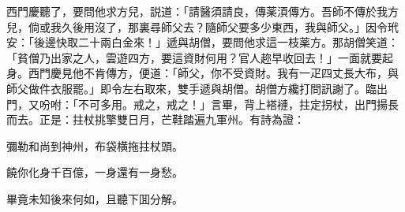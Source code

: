 西門慶聽了，要問他求方兒，説道：「請醫須請良，傳薬湏傳方。吾師不傳於我方兒，倘或我久後用沒了，那裏尋師父去？隨師父要多少東西，我與師父。」因令玳安：「後邊快取二十兩白金來！」遞與胡僧，要問他求這一枝薬方。那胡僧笑道：「貧僧乃出家之人，雲遊四方，要這資財何用？官人趂早收回去！」一面就要起身。西門慶見他不肯傳方，便道：「師父，你不受資財。我有一疋四丈長大布，與師父做件衣服罷。」即令左右取來，雙手遞與胡僧。胡僧方纔打問訊謝了。臨出門，又吩咐：「不可多用。戒之，戒之！」言畢，背上褡褳，拄定拐杖，出門揚長而去。正是：拄杖挑擎雙日月，芒鞋踏遍九軍州。有詩為證：

\begin{myquote}
彌勒和尚到神州，布袋横拖拄杖頭。

饒你化身千百億，一身還有一身愁。
\end{myquote}

畢竟未知後來何如，且聽下囬分解。

